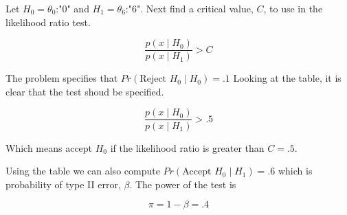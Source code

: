 \documentclass{tufte-book}
\theoremstyle{mytheoremstyle}
\theoremstyle{mylemstyle}
\theoremstyle{mydefstyle}
\begin{document}
\begin{table}
\end{table}

Let $H_0=\theta_0$:"$0$" and $H_1=\theta_6$:"$6$".  Next find a critical value, $C$, to use in the likelihood ratio test.

\[ \frac{p(x\mid H_0)}{p(x\mid H_1)} > C \]

The problem specifies that $Pr(\text{Reject }H_0 \mid H_0)=.1$  Looking at the table, it is clear that the test shoud be specified.


\[ \frac{p(x\mid H_0)}{p(x\mid H_1)} > .5 \]

Which means accept $H_0$ if the likelihood ratio is greater than   $C=.5$.

Using the table we can also compute $Pr(\text{Accept }H_0 \mid H_1) = .6$ which is probability of type II error, $\beta$.  The power of the test is

\[ \pi = 1- \beta = .4 \]
\end{document}
